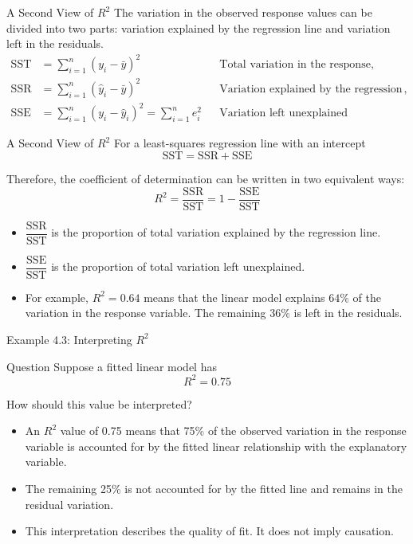 \documentclass[aspectratio=169]{beamer}
\begin{document}
\begin{frame}{A Second View of $R^2$}
The variation in the observed response values can be divided into two parts: variation explained by the regression line and variation left in the residuals.
\begin{align*}
\text{SST} &=\sum_{i=1}^{n}(y_i-\bar{y})^2 &&\text{Total variation in the response}, \\[1mm]
\text{SSR} &=\sum_{i=1}^{n}(\hat{y}_i-\bar{y})^2 &&\text{Variation explained by the regression line}, \\[1mm]
\text{SSE} &=\sum_{i=1}^{n}(y_i-\hat{y}_i)^2 =\sum_{i=1}^{n}e_i^2 &&\text{Variation left unexplained}
\end{align*}
\end{frame}

\begin{frame}{A Second View of $R^2$}
For a least-squares regression line with an intercept
$$\boxed{\text{SST}=\text{SSR}+\text{SSE}}$$

Therefore, the coefficient of determination can be written in two equivalent ways:
$$ \boxed{ R^2 =\frac{\text{SSR}}{\text{SST}} =1-\frac{\text{SSE}}{\text{SST}}} $$

\begin{itemize}
	\item $\dfrac{\text{SSR}}{\text{SST}}$ is the proportion of total variation explained by the regression line.
	\item $\dfrac{\text{SSE}}{\text{SST}}$ is the proportion of total variation left unexplained.
	\item For example, $R^2=0.64$ means that the linear model explains $64\%$ of the variation in the response variable. The remaining $36\%$ is left in the residuals.
\end{itemize}
\end{frame}

\begin{frame}{Example 4.3: Interpreting $R^2$}
\begin{block}{Question}
Suppose a fitted linear model has
$$R^2=0.75$$

How should this value be interpreted?
\end{block}
\begin{itemize}
 	\item An $R^2$ value of 0.75 means that 75\% of the observed variation in the response variable is accounted for by the fitted linear relationship with the explanatory variable.
	\item The remaining 25\% is not accounted for by the fitted line and remains in the residual variation.
	\item This interpretation describes the quality of fit. It does not imply causation.
\end{itemize}
\end{frame}
\end{document}
